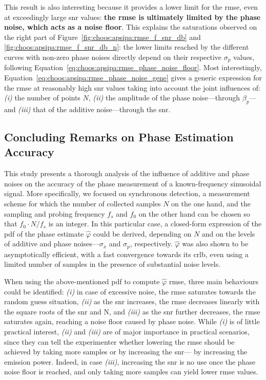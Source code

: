 This result is also interesting because it provides a lower limit for the \gls{rmse}, even at exceedingly large \gls{snr} values: \textbf{the \gls{rmse} is ultimately limited by the phase noise, which acts as a noise floor}. This explains the saturations observed on the right part of Figure~\ref{fig:choos:apsipa:rmse_f_snr_db} and \ref{fig:choos:apsipa:rmse_f_snr_db_n}: the lower limits reached by the different curves with non-zero phase noises directly depend on their respective $\sigma_p$ values, following Equation~\ref{eq:choos:apsipa:rmse_phase_noise_floor}. Most interestingly, Equation~\ref{eq:choos:apsipa:rmse_phase_noise_gene} gives a generic expression for the \gls{rmse} at reasonably high \gls{snr} values taking into account the joint influences of: \emph{(i)} the number of points $N$, \emph{(ii)} the amplitude of the phase noise---through $\beta_p$---and \emph{(iii)} that of the additive noise---through the \gls{snr}.

\subsection{Concluding Remarks on Phase Estimation Accuracy}\label{subsect:choos:apsipa:conclusion}

This study presents a thorough analysis of the influence of additive and phase noises on the accuracy of the phase measurement of a known-frequency sinusoidal signal. More specifically, we focused on synchronous detection, a measurement scheme for which the number of collected samples $N$ on the one hand, and the sampling and probing frequency $f_s$ and $f_0$ on the other hand can be chosen so that $f_0 \cdot N / f_s$ is an integer. In this particular case, a closed-form expression of the \gls{pdf} of the phase estimate $\widehat{\varphi}$ could be derived, depending on $N$ and on the levels of additive and phase noises---$\sigma_x$ and $\sigma_p$, respectively. $\widehat{\varphi}$ was also shown to be asymptotically efficient, with a fast convergence towards its \gls{crlb}, even using a limited number of samples in the presence of substantial noise levels.

When using the above-mentioned \gls{pdf} to compute $\widehat{\varphi}$ \gls{rmse}, three main behaviours could be identified: \textit{(i)} in case of excessive noise, the \gls{rmse} saturates towards the random guess situation, \textit{(ii)} as the \gls{snr} increases, the \gls{rmse} decreases linearly with the square roots of the \gls{snr} and N, and \textit{(iii)} as the \gls{snr} further decreases, the \gls{rmse} saturates again, reaching a noise floor caused by phase noise. While \textit{(i)} is of little practical interest, \textit{(ii)} and \textit{(iii)} are of major importance in practical scenarios, since they can tell the experimenter whether lowering the \gls{rmse} should be achieved by taking more samples or by increasing the \gls{snr}---\eg{} by increasing the emission power. Indeed, in case \textit{(iii)}, increasing the \gls{snr} is no use once the phase noise floor is reached, and only taking more samples can yield lower \gls{rmse} values.


